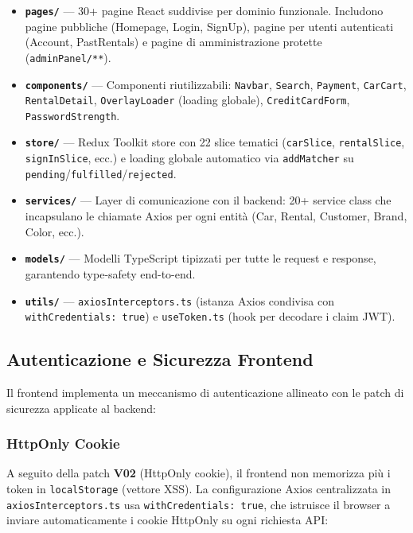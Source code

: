 \documentclass[12pt, a4paper]{article}
\begin{document}
    \begin{itemize}
        \item \textbf{\texttt{pages/}} --- 30+ pagine React suddivise per dominio
        funzionale. Includono pagine pubbliche (Homepage, Login, SignUp),
        pagine per utenti autenticati (Account, PastRentals) e pagine di
        amministrazione protette (\texttt{adminPanel/**}).
        \item \textbf{\texttt{components/}} --- Componenti riutilizzabili:
        \texttt{Navbar}, \texttt{Search}, \texttt{Payment},
        \texttt{CarCart}, \texttt{RentalDetail}, \texttt{OverlayLoader}
        (loading globale), \texttt{CreditCardForm}, \texttt{PasswordStrength}.
        \item \textbf{\texttt{store/}} --- Redux Toolkit store con 22 slice tematici
        (\texttt{carSlice}, \texttt{rentalSlice}, \texttt{signInSlice}, ecc.)
        e loading globale automatico via \texttt{addMatcher} su
        \texttt{pending}/\texttt{fulfilled}/\texttt{rejected}.
        \item \textbf{\texttt{services/}} --- Layer di comunicazione con il backend:
        20+ service class che incapsulano le chiamate Axios per ogni entità
        (Car, Rental, Customer, Brand, Color, ecc.).
        \item \textbf{\texttt{models/}} --- Modelli TypeScript tipizzati per tutte
        le request e response, garantendo type-safety end-to-end.
        \item \textbf{\texttt{utils/}} --- \texttt{axiosInterceptors.ts} (istanza
        Axios condivisa con \texttt{withCredentials: true}) e
        \texttt{useToken.ts} (hook per decodare i claim JWT).
    \end{itemize}


    \subsection{Autenticazione e Sicurezza Frontend}

    Il frontend implementa un meccanismo di autenticazione allineato con le patch
    di sicurezza applicate al backend:

    \subsubsection*{HttpOnly Cookie}

    A seguito della patch \textbf{V02} (HttpOnly cookie), il frontend non memorizza
    più i token in \texttt{localStorage} (vettore XSS). La configurazione Axios
    centralizzata in \texttt{axiosInterceptors.ts} usa \texttt{withCredentials: true},
    che istruisce il browser a inviare automaticamente i cookie HttpOnly su ogni
    richiesta API:
\end{document}
